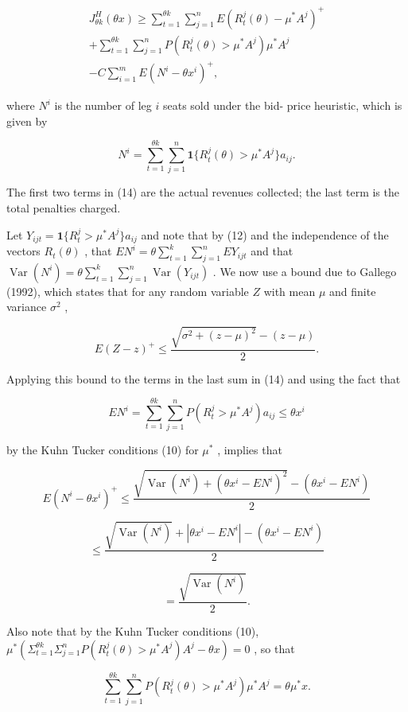 \[
\begin{array}{l}{{J_{\theta k}^{H}(\theta x)\geq\sum_{t=1}^{\theta k}\sum_{j=1}^{n}E(R_{t}^{j}(\theta)-\mu^{*}A^{j})^{+}}}\\ {{+\sum_{t=1}^{\theta k}\sum_{j=1}^{n}P(R_{t}^{j}(\theta)>\mu^{*}A^{j})\mu^{*}A^{j}}}\\ {{-C\sum_{i=1}^{m}E(N^{i}-\theta x^{i})^{+},}}\end{array} \tag{14}
\]

where \(N^{i}\) is the number of leg \(i\) seats sold under the bid-
price heuristic, which is given by

\[
N^{i} = \sum_{t = 1}^{\theta k} \sum_{j = 1}^{n} \mathbf{1}\{R_{t}^{j}(\theta) > \mu^{*} A^{j}\} a_{ij}.
\]

The first two terms in (14) are the actual revenues collected; the last
term is the total penalties charged.

Let \(Y_{ijt} = \mathbf{1}\{R_{t}^{j} > \mu^{*} A^{j}\} a_{ij}\) and
note that by (12) and the independence of the vectors \(R_{t}(\theta)\)
, that \(EN^{i} = \theta \sum_{t = 1}^{k} \sum_{j = 1}^{n} EY_{ijt}\)
and that
\(\operatorname {Var}(N^{i}) = \theta \sum_{t = 1}^{k} \sum_{j = 1}^{n} \operatorname {Var}(Y_{ijt})\)
. We now use a bound due to Gallego (1992), which states that for any
random variable \(Z\) with mean \(\mu\) and finite variance
\(\sigma^{2}\) ,

\[
E(Z - z)^{+} \leq \frac{\sqrt{\sigma^{2} + (z - \mu)^{2}} - (z - \mu)}{2}.
\]

Applying this bound to the terms in the last sum in (14) and using the
fact that

\[
EN^{i} = \sum_{t = 1}^{\theta k} \sum_{j = 1}^{n} P(R_{t}^{j} > \mu^{*} A^{j}) a_{ij} \leq \theta x^{i}
\]

by the Kuhn Tucker conditions (10) for \(\mu^{*}\) , implies that

\[
E(N^{i} - \theta x^{i})^{+}\leq \frac{\sqrt{\operatorname{Var}(N^{i}) + (\theta x^{i} - E N^{i})^{2}} - (\theta x^{i} - E N^{i})}{2}
\]

\[
\leq \frac{\sqrt{\operatorname{Var}(N^{i})} + |\theta x^{i} - E N^{i}| - (\theta x^{i} - E N^{i})}{2}
\]

\[
= \frac{\sqrt{\operatorname{Var}(N^{i})}}{2}. \tag{15}
\]

Also note that by the Kuhn Tucker conditions (10),
\(\mu^{*}(\Sigma_{t = 1}^{\theta k}\Sigma_{j = 1}^{n}P(R_{t}^{j}(\theta) > \mu^{*}A^{j})A^{j} - \theta x) = 0\)
, so that

\[
\sum_{t = 1}^{\theta k}\sum_{j = 1}^{n}P(R_{t}^{j}(\theta) > \mu^{*}A^{j})\mu^{*}A^{j} = \theta \mu^{*}x. \tag{16}
\]

